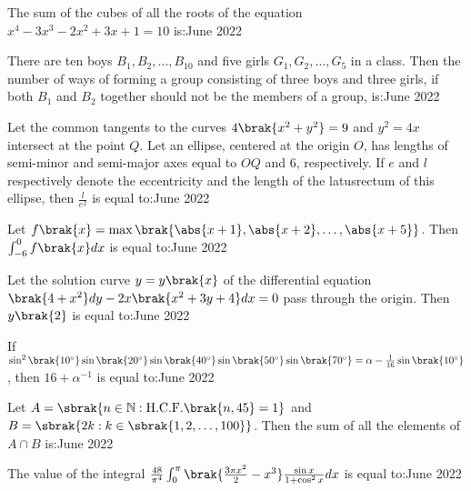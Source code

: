 \iffalse
   \title{Assignment}
   \author{EE24BTECH11034}
   \section{integer}
\fi 
    \item The sum of the cubes of all the roots of the equation $x^{4}-3x^{3}-2x^{2}+3x+1=10$ is:\hfill{June 2022}

     

    \item There are ten boys $B_1, B_2, \ldots, B_{10}$ and five girls $G_1, G_2, \ldots, G_5$ in a class. Then the number of ways of forming a group consisting of three boys and three girls, if both $B_1$ and $B_2$ together should not be the members of a group, is:\hfill{June 2022}

      

    \item Let the common tangents to the curves $4\brak{x^{2}+y^{2}}=9$ and $y^{2}=4x$ intersect at the point $Q$. Let an ellipse, centered at the origin $O$, has lengths of semi-minor and semi-major axes equal to $OQ$ and $6$, respectively. If $e$ and $l$ respectively denote the eccentricity and the length of the latusrectum of this ellipse, then $\frac{l}{e^{2}}$ is equal to:\hfill{June 2022}

      

    \item Let $f\brak{x}=\max\brak{\abs{x+1},\abs{x+2},\ldots,\abs{x+5}}$. Then $\int_{-6}^{0}f\brak{x}dx$ is equal to:\hfill{June 2022}


    \item Let the solution curve $y=y\brak{x}$ of the differential equation $\brak{4+x^{2}}dy-2x\brak{x^{2}+3y+4}dx=0$ pass through the origin. Then $y\brak{2}$ is equal to:\hfill{June 2022}

       

    \item If $\sin^{2}\brak{10^{\circ}}\sin\brak{20^{\circ}}\sin\brak{40^{\circ}}\sin\brak{50^{\circ}}\sin\brak{70^{\circ}}=\alpha-\frac{1}{16}\sin\brak{10^{\circ}}$, then $16+\alpha^{-1}$ is equal to:\hfill{June 2022}

    \item Let $A=\sbrak{n\in\mathbb{N}:\text{H.C.F.}\brak{n,45}=1}$ and $B=\sbrak{2k:k\in\sbrak{1,2,\ldots,100}}$. Then the sum of all the elements of $A\cap B$ is:\hfill{June 2022}

        
    \item The value of the integral $\frac{48}{\pi^{4}}\int_{0}^{\pi}\brak{\frac{3\pi x^{2}}{2}-x^{3}}\frac{\sin x}{1+\cos^{2}x}dx$ is equal to:\hfill{June 2022}
    

